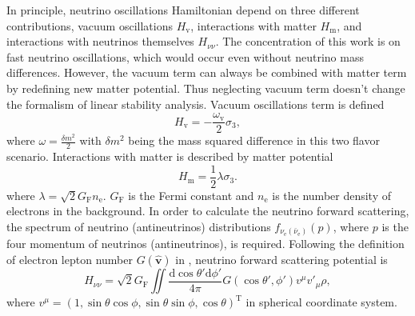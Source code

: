\documentclass[%
 reprint,
 amsmath,amssymb,
 aps,
 prd
]{revtex4-1}
\begin{document}
In principle, neutrino oscillations Hamiltonian depend on three different contributions, vacuum oscillations $H_{\mathrm v}$, interactions with matter $H_{\mathrm m}$, and interactions with neutrinos themselves $H_{\nu\nu}$. The concentration of this work is on fast neutrino oscillations, which would occur even without neutrino mass differences. However, the vacuum term can always be combined with matter term by redefining new matter potential. Thus neglecting vacuum term doesn't change the formalism of linear stability analysis. Vacuum oscillations term is defined
\begin{equation}
   H_{\mathrm v} = -\frac{\omega_{\mathrm v}}{2} \sigma_3,
\end{equation}
where $\omega = \frac{\delta m^2}{2}$ with $\delta m^2$ being the mass squared difference in this two flavor scenario. Interactions with matter is described by matter potential
\begin{equation}
   H_{\mathrm m} = \frac{1}{2}\lambda \sigma_3.
\end{equation}
where $\lambda = \sqrt{2}G_{\mathrm F} n_{\mathrm e}$. $G_{\mathrm F}$ is the Fermi constant and $n_{\mathrm e}$ is the number density of electrons in the background. In order to calculate the neutrino forward scattering, the spectrum of neutrino (antineutrinos) distributions $f_{\nu_{\mathrm e}(\bar \nu_{\mathrm e})}(p)$, where $p$ is the four momentum of neutrinos (antineutrinos), is required. Following the definition of electron lepton number $G(\hat{\mathbf v})$ in , neutrino forward scattering potential is
\begin{equation}
H_{\nu\nu} = \sqrt{2} G_{\mathrm F} \iint \frac{\mathrm d \cos\theta' \mathrm d\phi'}{4\pi} G(\cos\theta',\phi') v^\mu v'_\mu \rho,
\end{equation}
where $v^\mu = ( 1, \sin\theta\cos\phi, \sin\theta\sin\phi, \cos\theta )^{\mathrm T}$ in spherical coordinate system.
\end{document}
